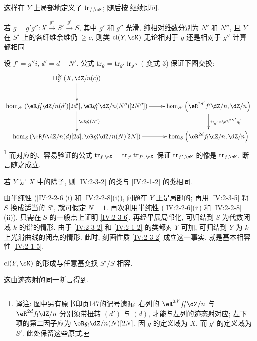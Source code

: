 这样在 $Y$ 上局部地定义了 $\tr_{f,\sK}$; 随后按 \cite[XVIII.2.9]{sga4} 继续即可.

\begin{lemma}\label{IV:2-3-5}
若 $g=g'g'':X\xrightarrow{g''} S'\xrightarrow{g'} S$,
其中 $g'$ 和 $g''$ 光滑, 纯相对维数分别为 $N'$ 和 $N''$,
且 $Y$ 在 $S'$ 上的各纤维余维仍 $\geqslant c$,
则类 $\operatorname{cl}(Y,\sK)$ 无论相对于 $g$ 还是相对于 $g''$ 计算都相同.
\end{lemma}

设 $f'=g'' i$, $d'=d-N'$.
公式 $\operatorname{tr}_g=\operatorname{tr}_{g'}\operatorname{tr}_{g''}$ (\cite[XVIII.2.9]{sga4} 变式 3) 保证下图交换:
\[\xymatrix{
  \h_Y^{2 c}\left(X,\dZ/n(c)\right) \ar[d] \\
  \hom_{S'}\left(\eR f_!'\dZ/n(d')[2 d'],\eR g_!''\dZ/n(N'')[2 N'']\right) \ar[r] \ar[d]^-{\eR g_!'(N')}
    & \hom_{S'}\left(\eR^{2 d'} f_!' \dZ/n,\dZ/n\right) \ar[d]^-{\tr_{g'}\circ \eR^{2 N'} g_!'} \\
  \hom_S\left(\eR f_!\dZ/n(d)[2d],\eR g_!'\dZ/n(N)[2 N]\right) \ar[r]
    & \hom_S\left(\eR^{2 d} f_!\dZ/n,\dZ/n\right)
}\]
\footnote{译注: 图中另有原书印页147的记号遗漏: 右列的 $\eR^{2d'}f'_!\dZ/n$ 与 $\eR^{2d}f_!\dZ/n$ 分别须带扭转 $(d')$ 与 $(d)$, 才能与左列的迹态射对应; 左下项的第二因子应为 $\eR g_!\dZ/n(N)[2N]$, 因 $g$ 的定义域为 $X$, 而 $g'$ 的定义域为 $S'$. 此处保留这些原式.}
而对应的、容易验证的公式 $\tr_{f,\sK}=\tr_{g'}\tr_{f',\sK}$
保证 $\tr_{f',\sK}$ 的像是 $\tr_{f,\sK}$. 断言随之成立.

\begin{lemma}\label{IV:2-3-6}
若 $Y$ 是 $X$ 中的除子, 则 \ref{IV:2-3-2} 的类与 \ref{IV:2-1-2} 的类相同.
\end{lemma}

由半纯性 (\ref{IV:2-2-6}(i) 和 \ref{IV:2-2-8}(i)), 问题在 $Y$ 上是局部的;
再用 \ref{IV:2-3-5} 将 $S$ 换成适当的 $S'$, 就可假定 $N=1$.
再次利用半纯性 (\ref{IV:2-2-6}(ii) 和 \ref{IV:2-2-8}(ii)),
只需在 $S$ 的一般点上证明 \ref{IV:2-3-6}.
再经平展局部化, 可归结到 $S$ 为代数闭域 $k$ 的谱的情形.
由于 \ref{IV:2-3-2} 和 \ref{IV:2-1-2} 的类都对 $Y$ 可加,
可归结到 $Y$ 为 $k$ 上光滑曲线的闭点的情形.
此时, 刻画性质 \ref{IV:2-3-2} 成立这一事实, 就是基本相容性 \ref{IV:2-1-5}.

\begin{lemma}\label{IV:2-3-7}
$\cl(Y,\sK)$ 的形成与任意基变换 $S'/S$ 相容.
\end{lemma}

这由迹态射的同一断言得到.

